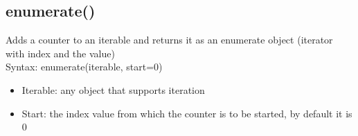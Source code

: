 \subsection{enumerate()}
Adds a counter to an iterable and returns it as an enumerate object
(iterator with index and the value) \\
Syntax: enumerate(iterable, start=0)  \\
\begin{itemize}
	\item Iterable: any object that supports iteration
	\item Start: the index value from which the counter is to be started, by default it is 0
\end{itemize}

